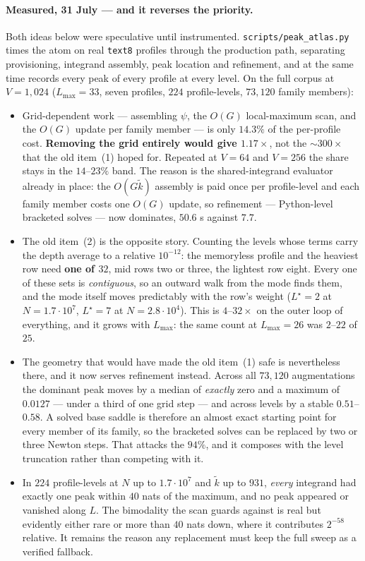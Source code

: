 \documentclass[11pt]{article}
\newcommand{\field}[1]{\paragraph{#1.}}
\begin{document}
\field{Measured, 31 July --- and it reverses the priority}
Both ideas below were speculative until instrumented.
\texttt{scripts/peak\_atlas.py} times the atom on real
\texttt{text8} profiles through the production path, separating
provisioning, integrand assembly, peak location and refinement, and
at the same time records every peak of every profile at every level.
On the full corpus at $V = 1{,}024$ ($L_{\max} = 33$, seven profiles,
$224$ profile-levels, $73{,}120$ family members):

\begin{itemize}
\item Grid-dependent work --- assembling $\psi$, the $O(G)$
  local-maximum scan, and the $O(G)$ update per family member --- is
  only $14.3\%$ of the per-profile cost.  \textbf{Removing the grid
  entirely would give $1.17\times$}, not the $\sim\!300\times$ that
  the old item~(1) hoped for.  Repeated at $V = 64$ and $V = 256$ the
  share stays in the $14$--$23\%$ band.  The reason is the
  shared-integrand evaluator already in place: the $O(G\tilde k)$
  assembly is paid once per profile-level and each family member
  costs one $O(G)$ update, so refinement --- Python-level bracketed
  solves --- now dominates, $50.6$ s against $7.7$.
\item The old item~(2) is the opposite story.  Counting the levels
  whose terms carry the depth average to a relative $10^{-12}$: the
  memoryless profile and the heaviest row need \textbf{one of $32$},
  mid rows two or three, the lightest row eight.  Every one of these
  sets is \emph{contiguous}, so an outward walk from the mode finds
  them, and the mode itself moves predictably with the row's weight
  ($L^\star = 2$ at $N = 1.7\cdot10^{7}$, $L^\star = 7$ at
  $N = 2.8\cdot10^{4}$).  This is $4$--$32\times$ on the outer loop
  of everything, and it grows with $L_{\max}$: the same count at
  $L_{\max} = 26$ was $2$--$22$ of $25$.
\item The geometry that would have made the old item~(1) safe is
  nevertheless there, and it now serves refinement instead.  Across
  all $73{,}120$ augmentations the dominant peak moves by a median of
  \emph{exactly} zero and a maximum of $0.0127$ --- under a third of
  one grid step --- and across levels by a stable $0.51$--$0.58$.  A
  solved base saddle is therefore an almost exact starting point for
  every member of its family, so the bracketed solves can be replaced
  by two or three Newton steps.  That attacks the $94\%$, and it
  composes with the level truncation rather than competing with it.
\item In $224$ profile-levels at $N$ up to $1.7\cdot 10^{7}$ and
  $\tilde k$ up to $931$, \emph{every} integrand had exactly one peak
  within $40$ nats of the maximum, and no peak appeared or vanished
  along $L$.  The bimodality the scan guards against is real but
  evidently either rare or more than $40$ nats down, where it
  contributes $2^{-58}$ relative.  It remains the reason any
  replacement must keep the full sweep as a verified fallback.
\end{itemize}
\end{document}
